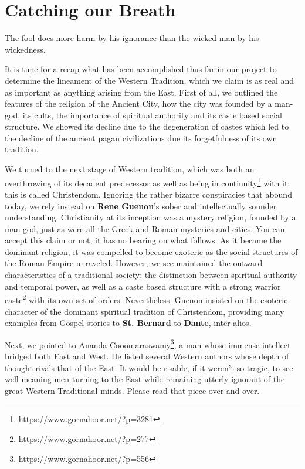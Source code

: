 \section{Catching our Breath}

\begin{quotex}
The fool does more harm by his ignorance than the wicked man by his wickedness. 

\end{quotex}

It is time for a recap what has been accomplished thus far in our project to determine the lineament of the Western Tradition, which we claim is as real and as important as anything arising from the East. First of all, we outlined the features of the religion of the Ancient City, how the city was founded by a man-god, its cults, the importance of spiritual authority and its caste based social structure. We showed its decline due to the degeneration of castes which led to the decline of the ancient pagan civilizations due its forgetfulness of its own tradition.

We turned to the next stage of Western tradition, which was both an overthrowing of its decadent predecessor as well as being in continuity\footnote{\url{https://www.gornahoor.net/?p=3281}} with it; this is called Christendom. Ignoring the rather bizarre conspiracies that abound today, we rely instead on \textbf{Rene Guenon}'s sober and intellectually sounder understanding. Christianity at its inception was a mystery religion, founded by a man-god, just as were all the Greek and Roman mysteries and cities. You can accept this claim or not, it has no bearing on what follows. As it became the dominant religion, it was compelled to become exoteric as the social structures of the Roman Empire unraveled. However, we see maintained the outward characteristics of a traditional society: the distinction between spiritual authority and temporal power, as well as a caste based structure with a strong warrior caste\footnote{\url{https://www.gornahoor.net/?p=277}} with its own set of orders. Nevertheless, Guenon insisted on the esoteric character of the dominant spiritual tradition of Christendom, providing many examples from Gospel stories to \textbf{St. Bernard} to \textbf{Dante}, inter alios.

Next, we pointed to Ananda Cooomaraswamy\footnote{\url{https://www.gornahoor.net/?p=556}}, a man whose immense intellect bridged both East and West. He listed several Western authors whose depth of thought rivals that of the East. It would be risable, if it weren't so tragic, to see well meaning men turning to the East while remaining utterly ignorant of the great Western Traditional minds. Please read that piece over and over.

